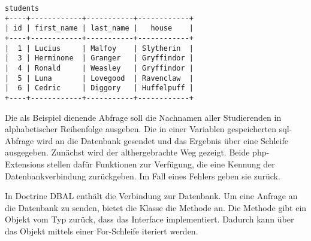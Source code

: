 \begin{Verbatim}[samepage=true]
students
+----+------------+-----------+------------+
| id | first_name | last_name |   house    |
+----+------------+-----------+------------+
|  1 | Lucius     | Malfoy    | Slytherin  |
|  3 | Herminone  | Granger   | Gryffindor |
|  4 | Ronald     | Weasley   | Gryffindor |
|  5 | Luna       | Lovegood  | Ravenclaw  |
|  6 | Cedric     | Diggory   | Huffelpuff |
+----+------------+-----------+------------+
\end{Verbatim}

Die als Beispiel dienende Abfrage soll die Nachnamen aller Studierenden in alphabetischer Reihenfolge ausgeben. Die in einer Variablen gespeicherten \gls{sql}-Abfrage wird an die Datenbank gesendet und das Ergebnis über eine Schleife ausgegeben. Zunächst wird der althergebrachte Weg gezeigt. Beide \gls{php}-Extensions stellen dafür  Funktionen zur Verfügung, die eine Kennung der Datenbankverbindung zurückgeben. Im Fall eines Fehlers geben sie  zurück.

\begin{listing}[H]
\caption{}
\label{lst:externalFetchAssocMethods}
\end{listing}

In Doctrine DBAL enthält  die Verbindung zur Datenbank. Um eine Anfrage an die Datenbank zu senden, bietet die Klasse die Methode  an. Die Methode gibt ein Objekt vom Typ  zurück, dass das  Interface implementiert. Dadurch kann über das Objekt mittels einer For-Schleife iteriert werden.

\begin{listing}[H]
\caption{}
\label{lst:dbalSimpleQuery}
\end{listing}

